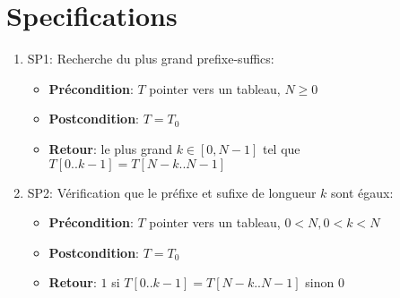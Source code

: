 \section{Specifications}\label{specifications}


\begin{enumerate}
    \item SP1: Recherche du plus grand prefixe-suffics:
        \begin{itemize}
            \item \textbf{Précondition}: $T$ pointer vers un tableau, $N \geq 0$
            \item \textbf{Postcondition}: $T = T_0$
            \item \textbf{Retour}: le plus grand $k \in [0, N-1]$ tel que $T[0..k-1] = T[N-k..N-1]$
        \end{itemize}

    \item SP2: Vérification que le préfixe et sufixe de longueur $k$ sont égaux:
        \begin{itemize}
            \item \textbf{Précondition}: $T$ pointer vers un tableau, $0 < N, 0 < k < N$
            \item \textbf{Postcondition}: $T = T_0$
            \item \textbf{Retour}: $1$ si $T[0..k-1] = T[N-k..N-1]$ sinon $0$
        \end{itemize}

\end{enumerate}
